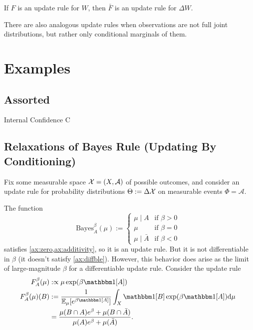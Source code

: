 \documentclass{article}
\begin{document}
If $F$ is an update rule for $W$, then $\bar F$ is an update rule for $\Delta W$. 

There are also analogous update rules when observations are not full joint distributions, but rather only conditional marginals of them.



\section{Examples}
\subsection{Assorted}

\begin{examplex}{Internal Confidence}{}
	C
\end{examplex}

\subsection{Relaxations of Bayes Rule (Updating By Conditioning)}
Fix some measurable space $\mathcal X = (X, \mathcal A)$ of possible outcomes, and consider an update rule for probability distributions $\Theta := \Delta\mathcal X$
on measurable events $\Phi = \mathcal A$.

The function
\[
	\mathrm{Bayes}^\beta_A(\mu) := \begin{cases}
			\mu \mid A &  \text{if }\beta > 0 \\
			\mu & \text{if } \beta = 0 \\
			\mu \mid \bar A &  \text{if } \beta < 0
		\end{cases}
\]
satisfies \cref{ax:zero,ax:additivity}, so it is an update rule.  But it is not differentiable in $\beta$ (it doesn't satisfy \cref{ax:diffble}).
However, this behavior does arise as the limit of large-magnitude $\beta$ for a differentiable update rule. Consider the update rule
\begin{align*}
	F^\beta_A (\mu) &:\propto \mu \exp(\beta \mathbbm1[A]) \\
	F^\beta_A (\mu)(B) &:=
		\frac{1}{\Ex_{\mu}[e^{\beta\mathbbm1[A]}]}\int_{X}  \mathbbm1[B] \exp(\beta \mathbbm1[A]) \mathrm d\mu \\
		&=
		\frac{\mu(B\cap A)e^{\beta} + \mu(B \cap \bar A) }
		{\mu(A)e^{\beta} + \mu(\bar A)}.
\end{align*}
\end{document}
